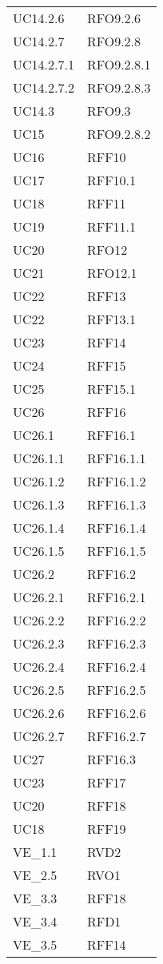 \begin{longtable}{ >{\centering}p{}
			>{\centering}p{}}
UC14.2.6 & RFO9.2.6 \tabularnewline
UC14.2.7 & RFO9.2.8 \tabularnewline
UC14.2.7.1 & RFO9.2.8.1 \tabularnewline
UC14.2.7.2 & RFO9.2.8.3 \tabularnewline
UC14.3 & RFO9.3 \tabularnewline
UC15 & RFO9.2.8.2 \tabularnewline
UC16 & RFF10 \tabularnewline
UC17 & RFF10.1 \tabularnewline
UC18 & RFF11 \tabularnewline
UC19 & RFF11.1 \tabularnewline
UC20 & RFO12 \tabularnewline
UC21 & RFO12.1 \tabularnewline
UC22 & RFF13 \tabularnewline
UC22 & RFF13.1 \tabularnewline
UC23 & RFF14 \tabularnewline
UC24 & RFF15 \tabularnewline
UC25 & RFF15.1 \tabularnewline
UC26 & RFF16 \tabularnewline
UC26.1 & RFF16.1 \tabularnewline
UC26.1.1 & RFF16.1.1 \tabularnewline
UC26.1.2 & RFF16.1.2 \tabularnewline
UC26.1.3 & RFF16.1.3 \tabularnewline
UC26.1.4 & RFF16.1.4 \tabularnewline
UC26.1.5 & RFF16.1.5 \tabularnewline
UC26.2 & RFF16.2 \tabularnewline
UC26.2.1 & RFF16.2.1 \tabularnewline
UC26.2.2 & RFF16.2.2 \tabularnewline
UC26.2.3 & RFF16.2.3 \tabularnewline
UC26.2.4 & RFF16.2.4 \tabularnewline
UC26.2.5 & RFF16.2.5 \tabularnewline
UC26.2.6 & RFF16.2.6 \tabularnewline
UC26.2.7 & RFF16.2.7 \tabularnewline
UC27 & RFF16.3 \tabularnewline
UC23 & RFF17 \tabularnewline
UC20 & RFF18 \tabularnewline
UC18 & RFF19 \tabularnewline
VE\_1.1 & RVD2 \tabularnewline
VE\_2.5 & RVO1 \tabularnewline
VE\_3.3 & RFF18 \tabularnewline
VE\_3.4 & RFD1 \tabularnewline
VE\_3.5 & RFF14 \tabularnewline
	\end{longtable}
